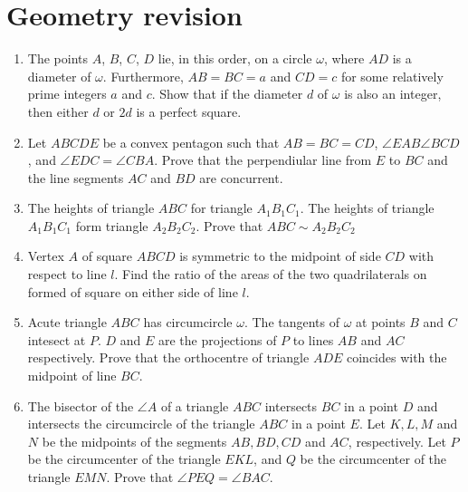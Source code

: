 \documentclass{article}
\begin{document}
\section{Geometry revision}
\begin{enumerate}
  \item %
  The points $A$, $B$, $C$, $D$ lie, in this order, on a circle $\omega$, where $AD$ is a diameter of $\omega$. Furthermore, $AB = BC = a$ and $CD = c$ for some relatively prime integers $a$ and $c$. Show that if the diameter $d$ of $\omega$ is also an integer, then either $d$ or $2d$ is a perfect square.

  \item %
  Let $ABCDE$ be a convex pentagon such that $AB = BC = CD$, $\angle EAB \angle BCD$, and $\angle EDC = \angle CBA$. Prove that the perpendiular line from $E$ to $BC$ and the line segments $AC$ and $BD$ are concurrent.

  \item %
  The heights of triangle $ABC$ for triangle $A_1B_1C_1$. The heights of triangle $A_1B_1C_1$ form triangle $A_2B_2C_2$. Prove that $ABC \sim A_2B_2C_2$

  \item %
  Vertex $A$ of square $ABCD$ is symmetric to the midpoint of side $CD$ with respect to line $l$. Find the ratio of the areas of the two quadrilaterals on formed of square on either side of line $l$.

  \item %
  Acute triangle $ABC$ has circumcircle $\omega$. The tangents of $\omega$ at points $B$ and $C$ intesect at $P$. $D$ and $E$ are the projections of $P$ to lines $AB$ and $AC$ respectively. Prove that the orthocentre of triangle $ADE$ coincides with the midpoint of line $BC$.

  \item %
  The bisector of the $\angle A$ of a triangle $ABC$ intersects $BC$ in a point $D$ and intersects the circumcircle of the triangle $ABC$ in a point $E$. Let $K, L, M$ and $N$ be the midpoints of the segments $AB, BD, CD$ and $AC$, respectively. Let $P$ be the circumcenter of the triangle $EKL$, and $Q$ be the circumcenter of the triangle $EMN$. Prove that $\angle PEQ = \angle BAC$.


\end{enumerate}
\end{document}
